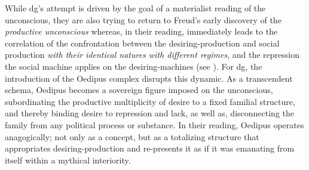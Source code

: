 While \gls{dg}'s attempt is driven by the goal of a materialist reading of the
unconscious, they are also trying to return to Freud's early discovery of the
\textit{productive unconscious} whereas, in their reading, immediately leads to
the correlation of the confrontation between the desiring-production and
social production \textit{with their identical natures with different
	regimes}, and the repression the social machine applies on the
desiring-machines (see \cite[54]{deleuze1983}). For \gls{dg}, the introduction of the Oedipus complex disrupts this dynamic. As a transcendent schema, Oedipus becomes a sovereign figure imposed on the unconscious, subordinating the productive multiplicity of desire to a fixed familial structure, and thereby binding desire to repression and lack, as well as, disconnecting the family from any political process or substance. In their reading, Oedipus operates anagogically; not only as a concept, but as a totalizing structure that appropriates desiring-production and re-presents it as if it was emanating from itself within a mythical interiority.

